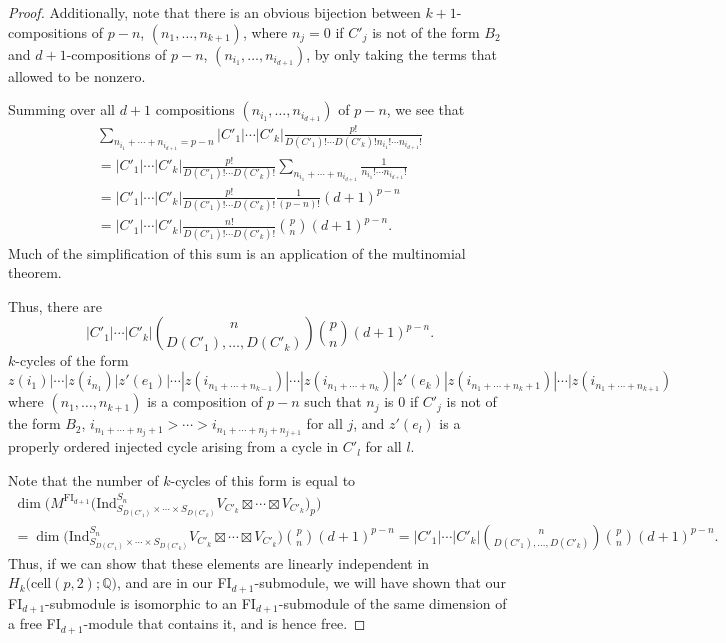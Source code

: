 \documentclass[12py]{amsart}%
\theoremstyle{definition}\newtheorem{definition}[thm]{Definition}
\theoremstyle{definition}
\newcommand{\Q}{\ensuremath{\mathbb{Q}}}
\begin{document}
\begin{proof}
Additionally, note that there is an obvious bijection between $k+1$-compositions of $p-n$, $(n_{1},\dots, n_{k+1})$, where $n_{j}=0$ if $C'_{j}$ is not of the form $B_{2}$ and $d+1$-compositions of $p-n$, $(n_{i_{1}}, \dots, n_{i_{d+1}})$, by only taking the terms that allowed to be nonzero.

Summing over all $d+1$ compositions $(n_{i_{1}},\dots, n_{i_{d+1}})$ of $p-n$, we see that
\begin{align*}
\sum_{n_{i_{1}}+\cdots+n_{i_{d+1}}=p-n}|C'_{1}|\cdots|C'_{k}|\frac{p!}{D(C'_{1})!\cdots D(C'_{k})!n_{i_{1}}!\cdots n_{i_{d+1}}!}\\
=|C'_{1}|\cdots|C'_{k}|\frac{p!}{D(C'_{1})!\cdots D(C'_{k})!}\sum_{n_{i_{1}}+\cdots+n_{i_{d+1}}}\frac{1}{n_{i_{1}}!\cdots n_{i_{d+1}}!}\\
=|C'_{1}|\cdots|C'_{k}|\frac{p!}{D(C'_{1})!\cdots D(C'_{k})!}\frac{1}{(p-n)!}(d+1)^{p-n}\\
=|C'_{1}|\cdots|C'_{k}|\frac{n!}{D(C'_{1})!\cdots D(C'_{k})!}\binom{p}{n}(d+1)^{p-n}.
\end{align*}
Much of the simplification of this sum is an application of the multinomial theorem.

Thus, there are 
\[
|C'_{1}|\cdots|C'_{k}|\binom{n}{D(C'_{1}),\dots, D(C'_{k})}\binom{p}{n}(d+1)^{p-n}.
\]
$k$-cycles of the form 
\[
z(i_{1})|\cdots|z(i_{n_{1}})|z'(e_{1})|\cdots|z(i_{n_{1}+\cdots+n_{k-1}})|\cdots|z(i_{n_{1}+\cdots+n_{k}})|z'(e_{k})|z(i_{n_{1}+\cdots+n_{k}+1})|\cdots|z(i_{n_{1}+\cdots+n_{k+1}})
\]
where $(n_{1},\dots, n_{k+1})$ is a composition of $p-n$ such that $n_{j}$ is $0$ if $C'_{j}$ is not of the form $B_{2}$, $i_{n_{1}+\cdots+n_{j}+1}>\cdots>i_{n_{1}+\cdots+n_{j}+n_{j+1}}$ for all $j$, and $z'(e_{l})$ is a properly ordered injected cycle arising from a cycle in $C'_{l}$ for all $l$.

Note that the number of $k$-cycles of this form is equal to 
\begin{align*}
\dim\bigg(M^{\text{FI}_{d+1}}\Big(\text{Ind}^{S_{n}}_{S_{D(C'_{1})}\times \cdots \times S_{D(C'_{k})}}V_{C'_{k}}\boxtimes\cdots \boxtimes V_{C'_{k}}\Big)_{p}\bigg)\\=
\dim\Big(\text{Ind}^{S_{n}}_{S_{D(C'_{1})}\times \cdots \times S_{D(C'_{k})}}V_{C'_{k}}\boxtimes\cdots \boxtimes V_{C'_{k}}\Big)\binom{p}{n}(d+1)^{p-n}=
|C'_{1}|\cdots|C'_{k}|\binom{n}{D(C'_{1}), \dots, D(C'_{k})}\binom{p}{n}(d+1)^{p-n}.
\end{align*}
Thus, if we can show that these elements are linearly independent in $H_{k}\big(\text{cell}(p,2);\Q\big)$, and are in our FI$_{d+1}$-submodule, we will have shown that our FI$_{d+1}$-submodule is isomorphic to an FI$_{d+1}$-submodule of the same dimension of a free FI$_{d+1}$-module that contains it, and is hence free.


\end{proof}
\end{document}
